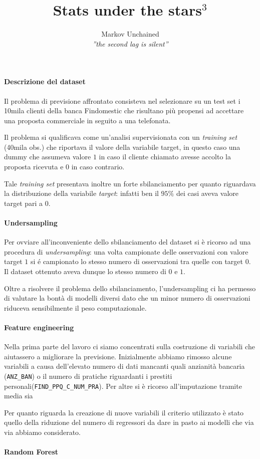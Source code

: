 \documentclass[]{scrreprt}
\title{Stats under the stars$^3$}
\author{Markov Unchained \\ \small \textit{''the second lag is silent''}}
\begin{document}
\maketitle

\paragraph{Descrizione del dataset}
Il problema di previsione affrontato consisteva nel selezionare su un test set i 10mila clienti della banca Findomestic che risultano pi\`u propensi ad accettare una proposta commerciale in seguito a una telefonata. 

Il problema si qualificava come un'analisi supervisionata con un \textit{training set} (40mila obs.) che riportava il valore della variabile target, in questo caso una dummy che assumeva valore $1$ in caso il cliente chiamato avesse accolto la proposta ricevuta e $0$ in caso contrario. 

Tale \textit{training set} presentava inoltre un forte sbilanciamento per quanto riguardava la distribuzione della variabile \textit{target}: infatti ben il $95\%$ dei casi aveva valore target pari a $0$.

\paragraph{Undersampling}

Per ovviare all'inconveniente dello sbilanciamento del dataset si \`e ricorso ad una procedura di \textit{undersampling}: una volta campionate delle osservazioni con valore target $1$ si é campionato lo stesso numero di osservazioni tra quelle con target $0$. Il dataset ottenuto aveva dunque lo stesso numero di $0$ e $1$.

Oltre a risolvere il problema dello sbilanciamento, l'undersampling ci ha permesso di valutare la bont\`a di modelli diversi dato che un minor numero di osservazioni riduceva sensibilmente il peso computazionale.

\paragraph{Feature engineering}  Nella prima parte del lavoro ci siamo concentrati sulla costruzione di variabili che aiutassero a migliorare la previsione. Inizialmente abbiamo rimosso alcune variabili a causa dell'elevato numero di dati mancanti quali anzianit\`a bancaria (\verb|ANZ_BAN|) o il numero di pratiche riguardanti i prestiti personali(\verb|FIND_PPQ_C_NUM_PRA|). Per altre si \`e ricorso all'imputazione tramite media sia 

Per quanto riguarda la creazione di nuove variabili il criterio utilizzato \`e stato quello della riduzione del numero di regressori da dare in pasto ai modelli che via via abbiamo considerato.

\paragraph{Random Forest}
\end{document}
